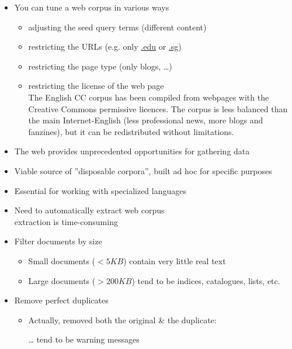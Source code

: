 \documentclass[a4paper,landscape,headrule,footrule,xetex]{foils}
\begin{document}

\begin{itemize}
\item You can tune a web corpus in various ways
  \begin{itemize}
  \item adjusting the seed query terms (different content)
  \item restricting the URLs (e.g. only \url{.edu} or \url{.sg})
  \item restricting the page type (only blogs, \ldots)
  \item restricting the license of the web page \\ The English CC
    corpus has been compiled from webpages with the Creative Commons
    permissive licences. The corpus is less balanced than the main
    Internet-English (less professional news, more blogs and
    fanzines), but it can be redistributed without limitations.

  \end{itemize}
\end{itemize}




 \begin{itemize}
  \item The web provides unprecedented opportunities for gathering data
  \item Viable source of ''disposable corpora”, built ad hoc for specific purposes
  \item Essential for working with specialized languages
  \item Need to automatically extract web corpus 
    \\ extraction is time-consuming
\end{itemize}


\begin{itemize}
\item Filter documents by size
  \begin{itemize}
  \item Small documents ($<5KB$) contain very little real text
  \item Large documents ($>200KB$) tend to be indices, catalogues, lists, etc.
  \end{itemize}
\item Remove perfect duplicates
  \begin{itemize}
  \item Actually, removed both the original \& the duplicate:
  \item[\ldots] tend to be warning messages 
  \end{itemize}
\end{itemize}
\end{document}
